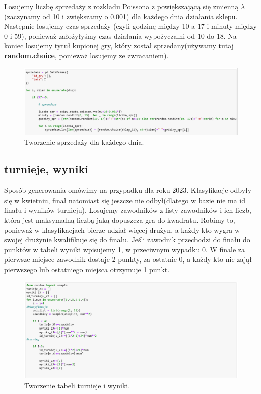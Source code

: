 \documentclass[12pt, letterpaper]{article}
\begin{document}
Losujemy liczbę sprzedaży z rozkładu Poissona z powiększającą się zmienną $\lambda$ (zaczynamy od 10 i zwiększamy o 0.001) dla każdego dnia działania sklepu. Następnie losujemy czas sprzedaży (czyli godzinę między 10 a 17 i minuty między 0 i 59), ponieważ założyłyśmy czas działania wypożyczalni od 10 do 18. Na koniec losujemy tytuł kupionej gry, który został sprzedany(używamy tutaj \textbf{random.choice}, ponieważ losujemy ze zwracaniem).
\begin{figure}[h!]
	\centering
	\includegraphics[width=1.0\textwidth]{8.png}
	\caption{Tworzenie sprzedaży dla każdego dnia.}
\end{figure}



\subsection{turnieje, wyniki}
Sposób generowania omówimy na przypadku dla roku 2023. Klasyfikacje odbyły się w kwietniu, finał natomiast się jeszcze nie odbył(dlatego w bazie nie ma id finału i wyników turnieju). Losujemy zawodników z listy zawodników i ich liczb, która jest maksymalną liczbą jaką dopuszcza gra do kwadratu. Robimy to, ponieważ w klasyfikacjach bierze udział więcej drużyn, a każdy kto wygra w swojej drużynie kwalifikuje się do finału. Jeśli zawodnik przechodzi do finału do punktów w tabeli wyniki wpisujemy 1, w przeciwnym wypadku 0.
W finale za pierwsze miejsce zawodnik dostaje 2 punkty, za ostatnie 0, a każdy kto nie zajął pierwszego lub ostatniego miejsca otrzymuje 1 punkt.
\begin{figure}[h!]
	\centering
	\includegraphics[width=1.0\textwidth]{9.png}
	\caption{Tworzenie tabeli turnieje i wyniki.}
\end{figure}
\end{document}
